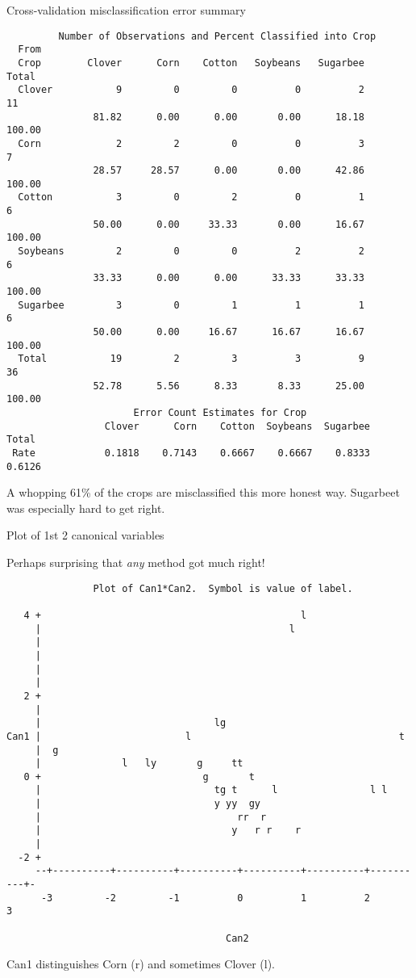 \documentclass[pdf]{prosper}
\begin{document}
\begin{slide}{Cross-validation misclassification error summary}

{\scriptsize
\begin{verbatim}
         Number of Observations and Percent Classified into Crop
  From
  Crop        Clover      Corn    Cotton   Soybeans   Sugarbee     Total
  Clover           9         0         0          0          2        11
               81.82      0.00      0.00       0.00      18.18    100.00
  Corn             2         2         0          0          3         7
               28.57     28.57      0.00       0.00      42.86    100.00
  Cotton           3         0         2          0          1         6
               50.00      0.00     33.33       0.00      16.67    100.00
  Soybeans         2         0         0          2          2         6
               33.33      0.00      0.00      33.33      33.33    100.00
  Sugarbee         3         0         1          1          1         6
               50.00      0.00     16.67      16.67      16.67    100.00
  Total           19         2         3          3          9        36
               52.78      5.56      8.33       8.33      25.00    100.00
                      Error Count Estimates for Crop
                 Clover      Corn    Cotton  Soybeans  Sugarbee     Total
 Rate            0.1818    0.7143    0.6667    0.6667    0.8333    0.6126

\end{verbatim}
}  

A whopping 61\% of the crops are misclassified this more honest way.
Sugarbeet was especially hard to get right.

\end{slide}

\begin{slide}{Plot of 1st 2 canonical variables}

Perhaps surprising that {\em any} method got much right!

{\tiny
\begin{verbatim}
               Plot of Can1*Can2.  Symbol is value of label.

   4 +                                             l
     |                                           l
     |
     |
     |
     |
   2 +
     |
     |                              lg
Can1 |                         l                                    t
     |  g
     |              l   ly       g     tt
   0 +                            g       t
     |                              tg t      l                l l
     |                              y yy  gy
     |                                  rr  r
     |                                 y   r r    r
     |
  -2 +
     --+----------+----------+----------+----------+----------+----------+-
      -3         -2         -1          0          1          2          3

                                      Can2

\end{verbatim}
}

Can1 distinguishes Corn (r) and sometimes Clover (l).
  
\end{slide}
\end{document}
